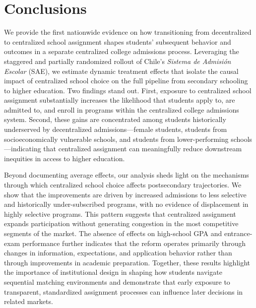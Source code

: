 \section{Conclusions}\label{sec:conclusion}
We provide the first nationwide evidence on how transitioning from decentralized to centralized school assignment shapes students' subsequent behavior and outcomes in a separate centralized college admissions process. Leveraging the staggered and partially randomized rollout of Chile's \textit{Sistema de Admisión Escolar} (SAE), we estimate dynamic treatment effects that isolate the causal impact of centralized school choice on the full pipeline from secondary schooling to higher education. Two findings stand out. First, exposure to centralized school assignment substantially increases the likelihood that students apply to, are admitted to, and enroll in programs within the centralized college admissions system. Second, these gains are concentrated among students historically underserved by decentralized admissions---female students, students from socioeconomically vulnerable schools, and students from lower-performing schools---indicating that centralized assignment can meaningfully reduce downstream inequities in access to higher education.

Beyond documenting average effects, our analysis sheds light on the mechanisms through which centralized school choice affects postsecondary trajectories. We show that the improvements are driven by increased admissions to less selective and historically under-subscribed programs, with no evidence of displacement in highly selective programs. This pattern suggests that centralized assignment expands participation without generating congestion in the most competitive segments of the market. The absence of effects on high-school GPA and entrance-exam performance further indicates that the reform operates primarily through changes in information, expectations, and application behavior rather than through improvements in academic preparation. Together, these results highlight the importance of institutional design in shaping how students navigate sequential matching environments and demonstrate that early exposure to transparent, standardized assignment processes can influence later decisions in related markets.


